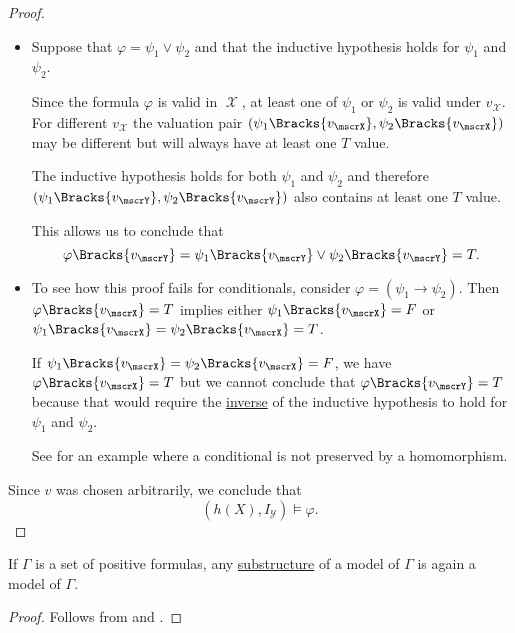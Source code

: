 \begin{proof}
\begin{itemize}
    \item Suppose that \( \varphi = \psi_1 \vee \psi_2 \) and that the inductive hypothesis holds for \( \psi_1 \) and \( \psi_2 \).

    Since the formula \( \varphi \) is valid in \( \mscrX \), at least one of \( \psi_1 \) or \( \psi_2 \) is valid under \( v_\mscrX \). For different \( v_\mscrX \) the valuation pair \( (\psi_1\Bracks{v_\mscrX}, \psi_2\Bracks{v_\mscrX}) \) may be different but will always have at least one \( T \) value.

    The inductive hypothesis holds for both \( \psi_1 \) and \( \psi_2 \) and therefore \( (\psi_1\Bracks{v_\mscrY}, \psi_2\Bracks{v_\mscrY}) \) also contains at least one \( T \) value.

    This allows us to conclude that
    \begin{equation*}
      \varphi\Bracks{v_\mscrY}
      =
      \psi_1\Bracks{v_\mscrY} \vee \psi_2\Bracks{v_\mscrY}
      =
      T.
    \end{equation*}

    \item To see how this proof fails for conditionals, consider \( \varphi = (\psi_1 \rightarrow \psi_2) \). Then \( \varphi\Bracks{v_\mscrX} = T \) implies either \( \psi_1\Bracks{v_\mscrX} = F \) or \( \psi_1\Bracks{v_\mscrX} = \psi_2\Bracks{v_\mscrX} = T \).

    If \( \psi_1\Bracks{v_\mscrX} = \psi_2\Bracks{v_\mscrX} = F \), we have \( \varphi\Bracks{v_\mscrX} = T \) but we cannot conclude that \( \varphi\Bracks{v_\mscrY} = T \) because that would require the \hyperref[def:material_implication/inverse]{inverse} of the inductive hypothesis to hold for \( \psi_1 \) and \( \psi_2 \).

    See  for an example where a conditional is not preserved by a homomorphism.
  \end{itemize}

  Since \( v \) was chosen arbitrarily, we conclude that
  \begin{equation*}
    (h(X), I_\mscrY) \vDash \varphi.
  \end{equation*}
\end{proof}

\begin{corollary}\label{thm:substructure_is_model}
  If \( \Gamma \) is a set of positive formulas, any \hyperref[def:first_order_substructure]{substructure} of a model of \( \Gamma \) is again a model of \( \Gamma \).
\end{corollary}
\begin{proof}
  Follows from  and .
\end{proof}

